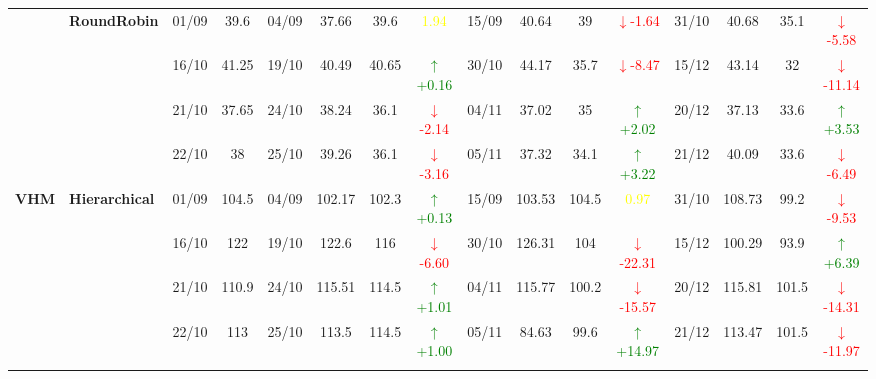 \documentclass{ieeeaccess}
\begin{document}
{\begin{longtable}{llcc|cccc|cccc|cccc}
& \textbf{RoundRobin}
& 01/09 & 39.6 & 04/09 & 37.66 & 39.6 & \textcolor{yellow}{1.94} & 15/09 & 40.64 & 39 & \textcolor{red}{\(\downarrow\)-1.64} & 31/10 & 40.68 & 35.1 & \textcolor{red}{\(\downarrow\)-5.58} \\

&
& 16/10 & 41.25 & 19/10 & 40.49 & 40.65 & \textcolor{green}{\(\uparrow\)+0.16} & 30/10 & 44.17 & 35.7 & \textcolor{red}{\(\downarrow\)-8.47} & 15/12 & 43.14 & 32 & \textcolor{red}{\(\downarrow\)-11.14} \\

&
& 21/10 & 37.65 & 24/10 & 38.24 & 36.1 & \textcolor{red}{\(\downarrow\)-2.14} & 04/11 & 37.02 & 35 & \textcolor{green}{\(\uparrow\)+2.02} & 20/12 & 37.13 & 33.6 & \textcolor{green}{\(\uparrow\)+3.53} \\

&
& 22/10 & 38 & 25/10 & 39.26 & 36.1 & \textcolor{red}{\(\downarrow\)-3.16} & 05/11 & 37.32 & 34.1 & \textcolor{green}{\(\uparrow\)+3.22} & 21/12 & 40.09 & 33.6 & \textcolor{red}{\(\downarrow\)-6.49} \\
\midrule




\multirow{12}{*}{\textbf{VHM}} 
& \textbf{Hierarchical}
& 01/09 & 104.5 & 04/09 & 102.17 & 102.3 & \textcolor{green}{\(\uparrow\)+0.13} & 15/09 & 103.53 & 104.5 & \textcolor{yellow}{0.97} & 31/10 & 108.73 & 99.2 & \textcolor{red}{\(\downarrow\)-9.53} \\

&
& 16/10 & 122 & 19/10 & 122.6 & 116 & \textcolor{red}{\(\downarrow\)-6.60} & 30/10 & 126.31 & 104 & \textcolor{red}{\(\downarrow\)-22.31} & 15/12 & 100.29 & 93.9 & \textcolor{green}{\(\uparrow\)+6.39} \\

&
& 21/10 & 110.9 & 24/10 & 115.51 & 114.5 & \textcolor{green}{\(\uparrow\)+1.01} & 04/11 & 115.77 & 100.2 & \textcolor{red}{\(\downarrow\)-15.57} & 20/12 & 115.81 & 101.5 & \textcolor{red}{\(\downarrow\)-14.31} \\

&
& 22/10 & 113 & 25/10 & 113.5 & 114.5 & \textcolor{green}{\(\uparrow\)+1.00} & 05/11 & 84.63 & 99.6 & \textcolor{green}{\(\uparrow\)+14.97} & 21/12 & 113.47 & 101.5 & \textcolor{red}{\(\downarrow\)-11.97} \\
\cmidrule(lr){2-16}



\end{longtable}}
\end{document}

